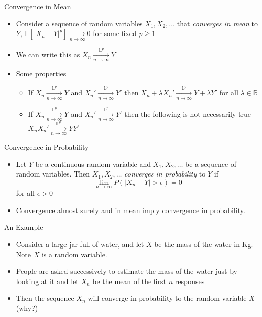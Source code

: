 \documentclass{beamer}
\begin{document}
\begin{frame}{Convergence in Mean} 
\begin{itemize}
 \item Consider a sequence of random variables $X_1, X_2, \ldots$ that \emph{converges in mean} to $Y$, $\mathbb{E}[|X_n - Y|^p] \xrightarrow[n \rightarrow \infty]{} 0$ for some fixed $p \geq 1$
 \item We can write this as $X_n \xrightarrow[n \rightarrow \infty]{\mathbb{L}^p} Y$ 
 \item Some properties 
 \begin{itemize} 
  \item If $X_n \xrightarrow[n \rightarrow \infty]{\mathbb{L}^p} Y$ and $X_n' \xrightarrow[n \rightarrow \infty]{\mathbb{L}^p} Y'$ then $X_n + \lambda X_n' \xrightarrow[n \rightarrow \infty]{\mathbb{L}^p} Y + \lambda Y'$ for all $\lambda \in \mathbb{R}$
  \item  If $X_n \xrightarrow[n \rightarrow \infty]{\mathbb{L}^p} Y$ and $X_n' \xrightarrow[n \rightarrow \infty]{\mathbb{L}^p} Y'$  then the following is not necessarily true $X_nX_n' \xrightarrow[n \rightarrow \infty]{\mathbb{L}^p} Y Y'$
 \end{itemize}
\end{itemize} 
\end{frame}

\begin{frame}{Convergence in Probability}  
\begin{itemize} 
 \item Let $Y$ be a continuous random variable and $X_1, X_2, \ldots$ be a sequence of random variables. Then $X_1, X_2, \ldots$ \emph{converges in probability} to $Y$ if 
\begin{displaymath}
\lim_{n \rightarrow \infty} P(|X_n - Y| > \epsilon) = 0
\end{displaymath}
for all $\epsilon > 0$
 \item Convergence almost surely and in mean imply convergence in probability. 
\end{itemize}
\end{frame}

\begin{frame}{An Example} 
\begin{itemize}
 \item Consider a large jar full of water, and let $X$ be the mass of the water in Kg. Note $X$ is a random variable. 
 \item People are asked successively to estimate the mass of the water just by looking at it and let $X_n$ be the mean of the first $n$ responses 
 \item Then the sequence $X_n$ will converge in probability to the random variable $X$ (why?)  
\end{itemize}
\end{frame}
\end{document}
